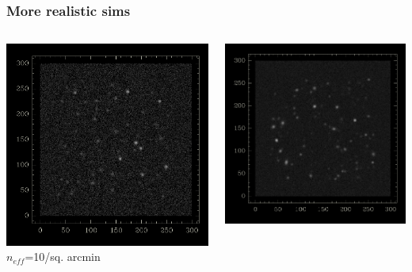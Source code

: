 \documentclass{beamer}
\newcommand{\neff}{$n_{eff}$}
\begin{document}
\begin{frame}
    \frametitle{More realistic sims}
 
    \begin{columns}
        \begin{column}{0.5\textwidth}
            \begin{center}
                \includegraphics[width=\columnwidth]{10persqarcmin.png}
                \newline
                \neff=10/sq. arcmin
            \end{center}
        \end{column}
        \begin{column}{0.5\textwidth}
            \begin{center}
                \includegraphics[width=\columnwidth]{35persqarcmin.png}

\end{center}
\end{column}
\end{columns}
\end{frame}
\end{document}
